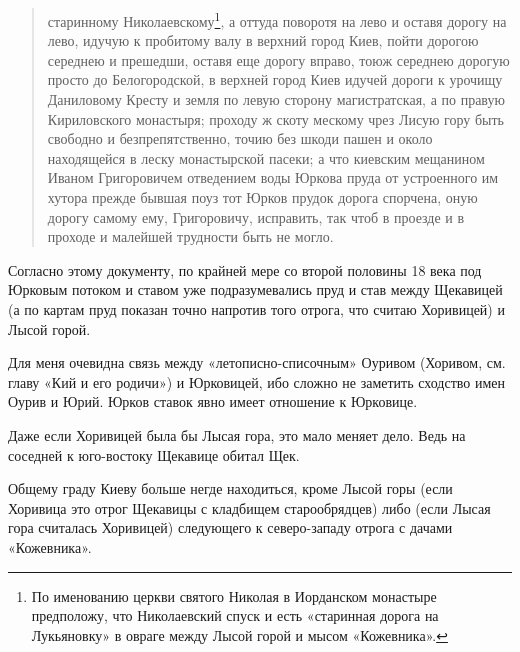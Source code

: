 \begin{quotation}
старинному Николаевскому\footnote{По именованию церкви святого Николая в Иорданском монастыре предположу, что Николаевский спуск и есть «старинная дорога на Лукьяновку» в овраге между Лысой горой и мысом «Кожевника».}, а оттуда поворотя на лево и оставя дорогу на лево, идучую к пробитому валу в верхний город Киев, пойти дорогою середнею и прешедши, оставя еще дорогу вправо, тоюж середнею дорогую просто до Белогородской, в верхней город Киев идучей дороги к урочищу Даниловому Кресту и земля по левую сторону магистратская, а по правую Кириловского монастыря; проходу ж скоту мескому чрез Лисую гору быть свободно и безпрепятственно, точию без шкоди пашен и около находящейся в леску монастырской пасеки; а что киевским мещанином Иваном Григоровичем отведением воды Юркова пруда от устроенного им хутора прежде бывшая поуз тот Юрков прудок дорога спорчена, оную дорогу самому ему, Григоровичу, исправить, так чтоб в проезде и в проходе и малейшей трудности быть не могло.
\end{quotation}

Согласно этому документу, по крайней мере со второй половины 18 века под Юрковым потоком и ставом уже подразумевались пруд и став между Щекавицей (а по картам пруд показан точно напротив того отрога, что считаю Хоривицей) и Лысой горой.

Для меня очевидна связь между «летописно-списоч\-ным» Оуривом (Хоривом, см. главу «Кий и его родичи») и Юрковицей, ибо сложно не заметить сходство имен Оурив и Юрий. Юрков ставок явно имеет отношение к Юрковице. 

Даже если Хоривицей была бы Лысая гора, это мало меняет дело. Ведь на соседней к юго-востоку Щекавице обитал Щек.

Общему граду Киеву больше негде находиться, кроме Лысой горы (если Хоривица это отрог Щекавицы с кладбищем старообрядцев) либо (если Лысая гора считалась Хоривицей) следующего к северо-западу отрога с дачами «Кожевника».



